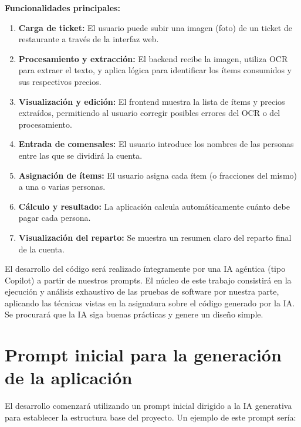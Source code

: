 \documentclass[a4paper, 11pt]{article}
\begin{document}
\textbf{Funcionalidades principales:}
\begin{enumerate}
    \item \textbf{Carga de ticket:} El usuario puede subir una imagen (foto) de un ticket de restaurante a través de la interfaz web.
    \item \textbf{Procesamiento y extracción:} El backend recibe la imagen, utiliza OCR para extraer el texto, y aplica lógica para identificar los ítems consumidos y sus respectivos precios.
    \item \textbf{Visualización y edición:} El frontend muestra la lista de ítems y precios extraídos, permitiendo al usuario corregir posibles errores del OCR o del procesamiento.
    \item \textbf{Entrada de comensales:} El usuario introduce los nombres de las personas entre las que se dividirá la cuenta.
    \item \textbf{Asignación de ítems:} El usuario asigna cada ítem (o fracciones del mismo) a una o varias personas.
    \item \textbf{Cálculo y resultado:} La aplicación calcula automáticamente cuánto debe pagar cada persona.
    \item \textbf{Visualización del reparto:} Se muestra un resumen claro del reparto final de la cuenta.
\end{enumerate}

El desarrollo del código será realizado íntegramente por una IA agéntica (tipo Copilot) a partir de nuestros prompts. El núcleo de este trabajo consistirá en la ejecución y análisis exhaustivo de las pruebas de software por nuestra parte, aplicando las técnicas vistas en la asignatura sobre el código generado por la IA. Se procurará que la IA siga buenas prácticas y genere un diseño simple.
\section{Prompt inicial para la generación de la aplicación}

El desarrollo comenzará utilizando un prompt inicial dirigido a la IA generativa para establecer la estructura base del proyecto. Un ejemplo de este prompt sería:
\end{document}
